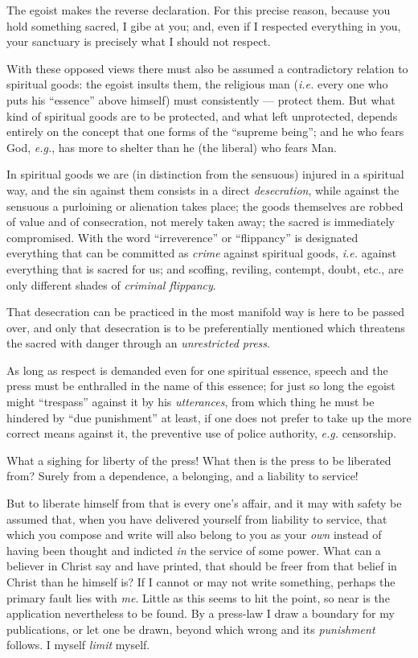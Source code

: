 The egoist makes the reverse declaration. For this precise reason, because you 
hold something sacred, I gibe at you; and, even if I respected everything in 
you, your sanctuary is precisely what I should not respect.

With these opposed views there must also be assumed a contradictory relation 
to spiritual goods: the egoist insults them, the religious man (\textit{i.e.} 
every one who puts his ``essence'' above himself) must consistently --- protect them. But what kind of spiritual goods are to be protected, and what 
left unprotected, depends entirely on the concept that one forms of the 
``supreme being''; and he who fears God, \textit{e.g.}, has more to shelter 
than he (the liberal) who fears Man.

In spiritual goods we are (in distinction from the sensuous) injured in a 
spiritual way, and the sin against them consists in a direct 
\textit{desecration}, while against the sensuous a purloining or alienation 
takes place; the goods themselves are robbed of value and of consecration, not 
merely taken away; the sacred is immediately compromised. With the word 
``irreverence'' or ``flippancy'' is designated everything that can be 
committed as \textit{crime} against spiritual goods, \textit{i.e.} against 
everything that is sacred for us; and scoffing, reviling, contempt, doubt, 
etc., are only different shades of \textit{criminal flippancy}.

That desecration can be practiced in the most manifold way is here to be 
passed over, and only that desecration is to be preferentially mentioned which 
threatens the sacred with danger through an \textit{unrestricted press}.

As long as respect is demanded even for one spiritual essence, speech and the 
press must be enthralled in the name of this essence; for just so long the 
egoist might ``trespass'' against it by his \textit{utterances}, from which 
thing he must be hindered by ``due punishment'' at least, if one does not 
prefer to take up the more correct means against it, the preventive use of 
police authority, \textit{e.g.} censorship.

What a sighing for liberty of the press! What then is the press to be 
liberated from? Surely from a dependence, a belonging, and a liability to 
service!

But to liberate himself from that is every one's affair, and it may with 
safety be assumed that, when you have delivered yourself from liability to 
service, that which you compose and write will also belong to you as your 
\textit{own} instead of having been thought and indicted \textit{in} the 
service of some power. What can a believer in Christ say and have printed, 
that should be freer from that belief in Christ than he himself is? If I 
cannot or may not write something, perhaps the primary fault lies with 
\textit{me}. Little as this seems to hit the point, so near is the application 
nevertheless to be found. By a press-law I draw a boundary for my 
publications, or let one be drawn, beyond which wrong and its 
\textit{punishment} follows. I myself \textit{limit} myself.

